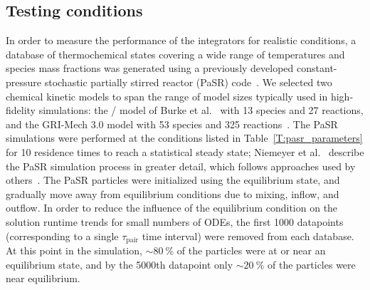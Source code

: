 \documentclass[preprint]{elsarticle}
\begin{document}
\subsection{Testing conditions}
\label{S:pasr_conditions}

In order to measure the performance of the integrators for realistic conditions, a database of thermochemical states covering a wide range of temperatures and species mass fractions was generated using a previously developed constant-pressure stochastic partially stirred reactor (PaSR) code~\cite{Niemeyer:2016aa,niemeyer_2016_51139}.
We selected two chemical kinetic models to span the range of model sizes typically used in high-fidelity simulations: the \slash{} model of Burke et al.~\cite{Burke:2011fh} with 13 species and 27 reactions, and the GRI-Mech 3.0 model with 53 species and 325 reactions~\cite{smith_gri-mech_30}.
The PaSR simulations were performed at the conditions listed in Table~\ref{T:pasr_parameters} for 10 residence times to reach a statistical steady state; Niemeyer et al.~\cite{Niemeyer:2016aa} describe the PaSR simulation process in greater detail, which follows approaches used by others~\cite{Chen:1997ta,Pope:1997wu,Ren:2014cd}.
The PaSR particles were initialized using the equilibrium state, and gradually move away from equilibrium conditions due to mixing, inflow, and outflow.
In order to reduce the influence of the equilibrium condition on the solution runtime trends for small numbers of ODEs, the first \num{1000} datapoints (corresponding to a single $\tau_\text{pair}$ time interval) were removed from each database.
At this point in the simulation, $\sim\SI{80}{\percent}$ of the particles were at or near an equilibrium state, and by the \num{5000}th datapoint only $\sim\SI{20}{\percent}$ of the particles were near equilibrium.
\end{document}
